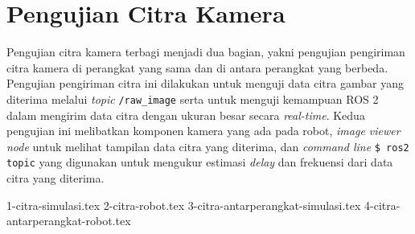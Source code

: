 \section{Pengujian Citra Kamera}
\label{sec:pengujiancitrakamera}

Pengujian citra kamera terbagi menjadi dua bagian,
  yakni pengujian pengiriman citra kamera di perangkat yang sama dan di antara perangkat yang berbeda.
Pengujian pengiriman citra ini dilakukan untuk menguji data citra gambar yang diterima melalui \emph{topic} \lstinline{/raw_image} serta untuk menguji kemampuan ROS 2 dalam mengirim data citra dengan ukuran besar secara \emph{real-time}.
Kedua pengujian ini melibatkan komponen kamera yang ada pada robot,
  \emph{image viewer node} untuk melihat tampilan data citra yang diterima,
  dan \emph{command line} \lstinline{$ ros2 topic} yang digunakan untuk mengukur estimasi \emph{delay} dan frekuensi dari data citra yang diterima.

{1-citra-simulasi.tex}
{2-citra-robot.tex}
{3-citra-antarperangkat-simulasi.tex}
{4-citra-antarperangkat-robot.tex}
